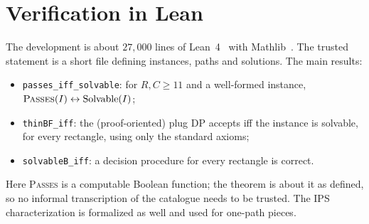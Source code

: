 \documentclass[11pt]{article}
\newcommand{\pass}{\textup{\textsc{Passes}}\xspace}
\begin{document}
\section{Verification in Lean}\label{sec:lean}

The development is about $27{,}000$ lines of Lean~4~\cite{lean4} with Mathlib~\cite{mathlib20}.
The trusted statement is a short file defining instances, paths and solutions. The main results:
\begin{itemize}
\item \texttt{passes\_iff\_solvable}: for $R, C \ge 11$ and a well-formed instance,
  $\pass(I) \leftrightarrow \mathrm{Solvable}(I)$;
\item \texttt{thinBF\_iff}: the (proof-oriented) plug DP accepts iff the instance is solvable, for
  every rectangle, using only the standard axioms;
\item \texttt{solvableB\_iff}: a decision procedure for every rectangle is correct.
\end{itemize}
Here \pass is a computable Boolean function; the theorem is about it as defined, so no informal
transcription of the catalogue needs to be trusted. The IPS characterization is formalized as
well and used for one-path pieces.
\end{document}
